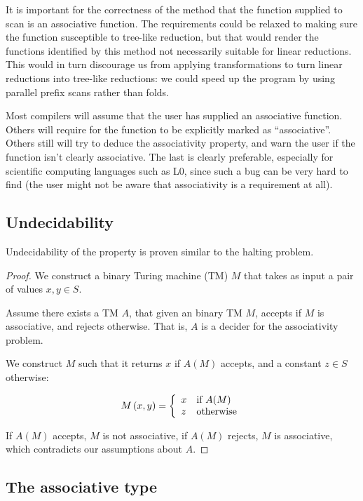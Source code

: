 It is important for the correctness of the method that the function supplied to
scan is an associative function. The requirements could be relaxed to making
sure the function susceptible to tree-like reduction, but that would render the
functions identified by this method not necessarily suitable for linear
reductions. This would in turn discourage us from applying transformations to
turn linear reductions into tree-like reductions: we could speed up the program
by using parallel prefix scans rather than folds.

Most compilers will assume that the user has supplied an associative function.
Others will require for the function to be explicitly marked as
``associative''. Others still will try to deduce the associativity property,
and warn the user if the function isn't clearly associative. The last is
clearly preferable, especially for scientific computing languages such as L0,
since such a bug can be very hard to find (the user might not be aware that
associativity is a requirement at all).

\subsection{Undecidability}\label{section:undecidability}

Undecidability of the property is proven similar to the halting problem.

\begin{proof} We construct a binary Turing machine (TM) $M$ that takes as input
a pair of values $x,y\in S$.

Assume there exists a TM $A$, that given an binary TM $M$, accepts if $M$ is
associative, and rejects otherwise. That is, $A$ is a decider for the
associativity problem.

We construct $M$ such that it returns $x$ if $A(M)$ accepts, and a constant
$z\in S$ otherwise:

\[M\left({x,y}\right) = \left\{ \begin{array}{l l} x & \text{if $A(M)$} \\ z &
\text{otherwise} \end{array} \right.\]

If $A(M)$ accepts, $M$ is not associative, if $A(M)$ rejects, $M$ is
associative, which contradicts our assumptions about $A$. \end{proof}

\subsection{The associative type}

